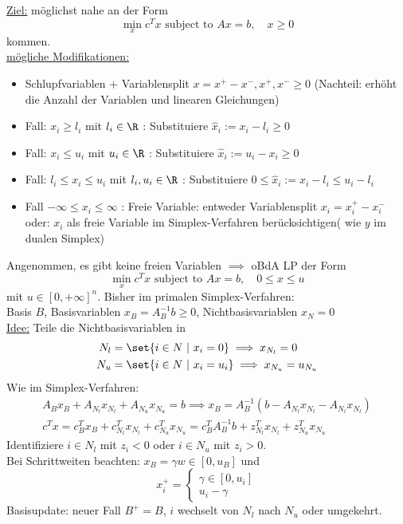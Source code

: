 \underline{Ziel:} möglichst nahe an der Form
\begin{equation*}
	\min_{x} c^{T} x \text{ subject to } Ax = b ,\quad x \geq 0
\end{equation*}
kommen.\\
\underline{mögliche Modifikationen:}
\begin{itemize}
	\item Schlupfvariablen + Variablensplit $x = x^+ -x^-, x^+,x^- \geq0 $ (Nachteil: erhöht die Anzahl der Variablen und linearen Gleichungen)
	\item Fall: $x_{i} \geq l_{i}$ mit $l_{i}\in \R$ : Substituiere $\hat{x}_{i} := x_{i}- l_{i}\geq 0$
	\item Fall: $x_{i} \leq u_{i}$ mit $u_{i}\in \R$ : Substituiere  $\hat{x}_{i} := u_{i}- x_{i}\geq 0$
	\item Fall: $l_{i} \leq x_{i} \leq u_{i}$ mit $l_{i},u_{i} \in \R$ : Substituiere $0 \leq \hat{x}_{i} := x_{i}- l_{i} \leq u_{i}-l_{i}$
	\item Fall $-\infty \leq x_{i} \leq \infty$ : Freie Variable: entweder Variablensplit $x_{i}= x_{i}^+ - x_{i}^-$ oder: $x_{i}$ als freie Variable im Simplex-Verfahren berücksichtigen( wie $y$ im dualen Simplex)
\end{itemize}
Angenommen, es gibt keine freien Variablen $\implies$ oBdA LP der Form
\begin{equation*}
	\min_{x} c^{T} x \text{ subject to } Ax = b, \quad 0 \leq x \leq u
\end{equation*}
mit $u \in [0, + \infty]^n$.\nl
Bisher im primalen Simplex-Verfahren:\\
Basis $B$, Basisvariablen $x_{B}= A_{B}^{-1} b \geq 0$, Nichtbasisvariablen $x_{N}=0$ \\
\underline{Idee:} Teile die Nichtbasisvariablen in
\begin{align*}
	N_{l} &= \set{ i \in N \ | \ x_{i} = 0  } \implies x_{N_{l}}=0\\
	N_{u} &= \set{ i \in N \ | \ x_{i} = u_{i}  } \implies x_{N_{u}}=u_{N_{u}}
\end{align*}
Wie im Simplex-Verfahren:
\begin{align*}
	A_{B}x_{B} + A_{N_{l}}x_{N_{l}} + A_{N_{u}} x_{N_{u}} = b \implies x_{B} = A_{B}^{-1} (b - A_{N_{l}} x_{N_{l}} - A_{N_{l}}x_{N_{l}})\\
	c^{T} x = c_{B}^{T} x_{B} + c_{N_{l}}^{T} x_{N_{l}}+c_{N_{u}}^{T} x_{N_{u}} = c_{B}^{T} A_{B}^{-1} b + z_{N_{l}}^{T} x_{N_{l}} + z_{N_{u}}^{T} x_{N_{u}}
\end{align*}
Identifiziere $i \in N_{l}$ mit $z_{i} <0 $ oder $ i\in N_{u}$ mit $z_{i}> 0$.\\
Bei Schrittweiten beachten: $x_{B} = \gamma w \in [0,u_{B}]$ und
\begin{equation*}
	x_{i}^+ = \begin{cases}
	 \gamma \in [0,u_{i}]\\
	 u_{i}-\gamma
\end{cases}
\end{equation*}
Basisupdate: neuer Fall $B^+ = B$, $i$ wechselt von $N_{l}$ nach $N_{u}$ oder umgekehrt.

